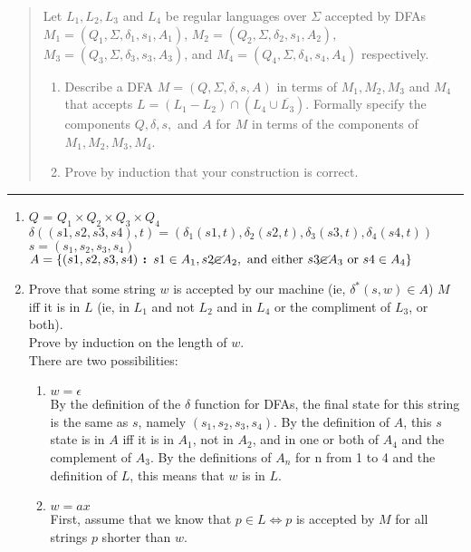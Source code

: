 \documentclass[11pt]{article}
\begin{document}
\begin{quote}
    Let $L_1, L_2,L_3$ and $L_4$ be regular languages over $\Sigma$
  accepted by DFAs $M_1 = (Q_1, \Sigma, \delta_1, s_1, A_1)$,
  $M_2 = (Q_2, \Sigma, \delta_2, s_1, A_2)$, $M_3 = (Q_3,
  \Sigma, \delta_3, s_3, A_3)$, and $M_4 = (Q_4,
  \Sigma, \delta_4, s_4, A_4)$ respectively.

\begin{enumerate}
\item Describe a DFA $M = (Q, \Sigma, \delta, s, A)$ in terms of $M_1,
  M_2,M_3$ and $M_4$ that accepts $L = (L_1 - L_2) \cap (L_4 \cup \overline{L_3})$.  Formally specify the components $Q, \delta, s,$ and $A$
  for $M$ in terms of the components of $M_1, M_2,M_3, M_4$.
\item Prove by induction that your construction is correct.
\end{enumerate}
\end{quote}
\hrule



\begin{solution}
    \begin{enumerate}
        \item $Q$ = $Q_1 \times Q_2 \times Q_3 \times Q_4$ \\
            $\delta((s1,s2,s3,s4),t) = (\delta_1(s1,t),\delta_2(s2,t),\delta_3(s3,t),\delta_4(s4,t))$ \\
            $s = (s_1,s_2,s_3,s_4)$ \\
            $A = \{(s1, s2, s3, s4) \textbf{ : } s1 \in A_1, s2 \cancel{\in} A_2, \text{ and either } s3 \cancel{\in} A_3\text{ or } s4 \in A_4 \}$
        \item Prove that some string $w$ is accepted by our machine (ie, $\delta^*(s, w) \in A$) $M$ iff it is in $L$ (ie, in $L_1$ and not $L_2$ and in $L_4$ or the compliment of $L_3$, or both). \\
            Prove by induction on the length of $w$.\\
            There are two possibilities: 
            \begin{enumerate}
                \item $w = \epsilon$ \\
                    By the definition of the $\delta$ function for DFAs, the final state for this string is the same as $s$, namely $(s_1, s_2, s_3, s_4)$. By the definition of $A$, this $s$ state is in $A$ iff it is in $A_1$, not in $A_2$, and in one or both of $A_4$ and the complement of $A_3$. By the definitions of $A_n$ for n from 1 to 4 and the definition of $L$, this means that $w$ is in $L$.
                \item $w = ax$ \\
                    First, assume that we know that $p \in L \iff p$ is accepted by $M$ for all strings $p$ shorter than $w$.
            \end{enumerate}
    \end{enumerate}
\end{solution}
\end{document}
